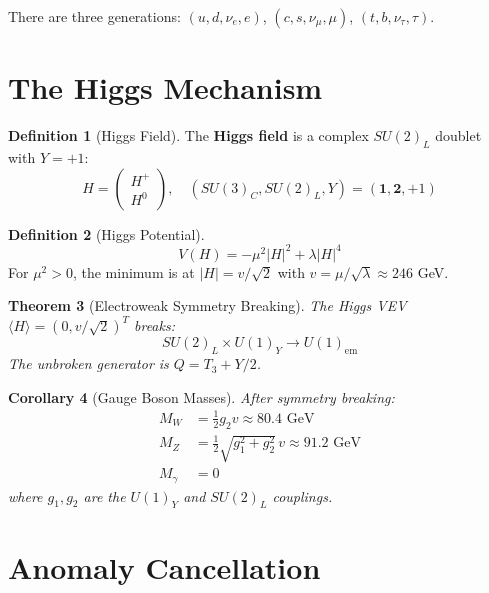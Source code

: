 \documentclass[11pt,a4paper,openright]{book}
\theoremstyle{plain}
\newtheorem{theorem}{Theorem}[chapter]
\newtheorem{corollary}[theorem]{Corollary}
\theoremstyle{definition}
\newtheorem{definition}[theorem]{Definition}
\begin{document}
There are three generations: $(u, d, \nu_e, e)$, $(c, s, \nu_\mu, \mu)$, $(t, b, \nu_\tau, \tau)$.

\section{The Higgs Mechanism}

\begin{definition}[Higgs Field]
The \textbf{Higgs field} is a complex $SU(2)_L$ doublet with $Y = +1$:
\begin{equation}
H = \begin{pmatrix} H^+ \\ H^0 \end{pmatrix}, \quad (SU(3)_C, SU(2)_L, Y) = (\mathbf{1}, \mathbf{2}, +1)
\end{equation}
\end{definition}

\begin{definition}[Higgs Potential]
\begin{equation}
V(H) = -\mu^2 |H|^2 + \lambda |H|^4
\end{equation}
For $\mu^2 > 0$, the minimum is at $|H| = v/\sqrt{2}$ with $v = \mu/\sqrt{\lambda} \approx 246$ GeV.
\end{definition}

\begin{theorem}[Electroweak Symmetry Breaking]
The Higgs VEV $\langle H \rangle = (0, v/\sqrt{2})^T$ breaks:
\begin{equation}
SU(2)_L \times U(1)_Y \to U(1)_{\mathrm{em}}
\end{equation}
The unbroken generator is $Q = T_3 + Y/2$.
\end{theorem}

\begin{corollary}[Gauge Boson Masses]
After symmetry breaking:
\begin{align}
M_W &= \frac{1}{2} g_2 v \approx 80.4 \text{ GeV} \\
M_Z &= \frac{1}{2}\sqrt{g_1^2 + g_2^2} \, v \approx 91.2 \text{ GeV} \\
M_\gamma &= 0
\end{align}
where $g_1, g_2$ are the $U(1)_Y$ and $SU(2)_L$ couplings.
\end{corollary}

\section{Anomaly Cancellation}
\end{document}
